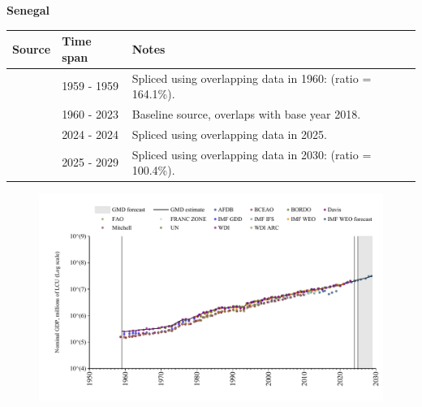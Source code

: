 \documentclass[12pt,a4paper,landscape]{article}
\begin{document}
\begin{adjustbox}{max totalsize={\paperwidth}{\paperheight},center}
\begin{minipage}[t][\textheight][t]{\textwidth}
\vspace*{0.5cm}
{}
\begin{center}
{\Large\bfseries Senegal}
\end{center}
\vspace{0.5cm}
\begin{table}[H]
\centering
\small
\begin{tabular}{|l|l|l|}
\hline
\textbf{Source} & \textbf{Time span} & \textbf{Notes} \\
\hline
\rowcolor{white}\cite{Mitchell}& 1959 - 1959 &Spliced using overlapping data in 1960: (ratio = 164.1\%).\\
\rowcolor{lightgray}\cite{WDI}& 1960 - 2023 &Baseline source, overlaps with base year 2018.\\
\rowcolor{white}\cite{BCEAO}& 2024 - 2024 &Spliced using overlapping data in 2025.\\
\rowcolor{lightgray}\cite{IMF_WEO_forecast}& 2025 - 2029 &Spliced using overlapping data in 2030: (ratio = 100.4\%).\\
\hline
\end{tabular}
\end{table}
\begin{figure}[H]
\centering
\includegraphics[width=\textwidth,height=0.6\textheight,keepaspectratio]{graphs/SEN_nGDP.pdf}
\end{figure}
\end{minipage}
\end{adjustbox}
\end{document}
